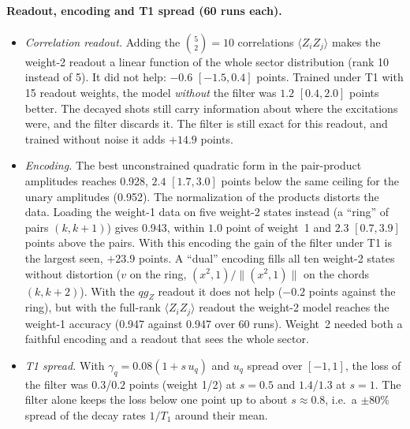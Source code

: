 \documentclass[11pt]{article}
\newcommand{\qZ}{qg_Z}
\begin{document}
\paragraph{Readout, encoding and T1 spread (60 runs each).}\label{sec:more}
\begin{itemize}
\item \textit{Correlation readout.} Adding the $\binom52=10$ correlations $\langle Z_iZ_j\rangle$ makes the
  weight-2 readout a linear function of the whole sector distribution (rank 10 instead of 5). It did not
  help: $-0.6$ $[-1.5,0.4]$ points. Trained under T1 with 15 readout weights, the model \emph{without} the
  filter was $1.2$ $[0.4,2.0]$ points better. The decayed shots still carry information about where the
  excitations were, and the filter discards it. The filter is still exact for this readout, and trained
  without noise it adds $+14.9$ points.
\item \textit{Encoding.} The best unconstrained quadratic form in the pair-product amplitudes reaches 0.928,
  $2.4$ $[1.7,3.0]$ points below the same ceiling for the unary amplitudes (0.952). The normalization of the
  products distorts the data. Loading the weight-1 data on five weight-2 states instead (a ``ring'' of
  pairs $(k,k+1)$) gives 0.943, within $1.0$ point of weight~1 and $2.3$ $[0.7,3.9]$ points above the pairs.
  With this encoding the gain of the filter under T1 is the largest seen, $+23.9$ points. A ``dual''
  encoding fills all ten weight-2 states without distortion ($v$ on the ring, $(x^2,1)/\|(x^2,1)\|$ on the
  chords $(k,k+2)$). With the $\qZ$ readout it does not help ($-0.2$ points against the ring), but with the
  full-rank $\langle Z_iZ_j\rangle$ readout the weight-2 model reaches the weight-1 accuracy (0.947 against
  0.947 over 60 runs). Weight~2 needed both a faithful encoding and a readout that sees the whole sector.
\item \textit{T1 spread.} With $\gamma_q=0.08(1+s\,u_q)$ and $u_q$ spread over $[-1,1]$, the loss of the
  filter was $0.3$/$0.2$ points (weight 1/2) at $s=0.5$ and $1.4$/$1.3$ at $s=1$. The filter alone keeps the loss
  below one point up to about $s\approx0.8$, i.e.\ a $\pm80\%$ spread of the decay rates $1/T_1$ around their
  mean.
\end{itemize}
\end{document}
